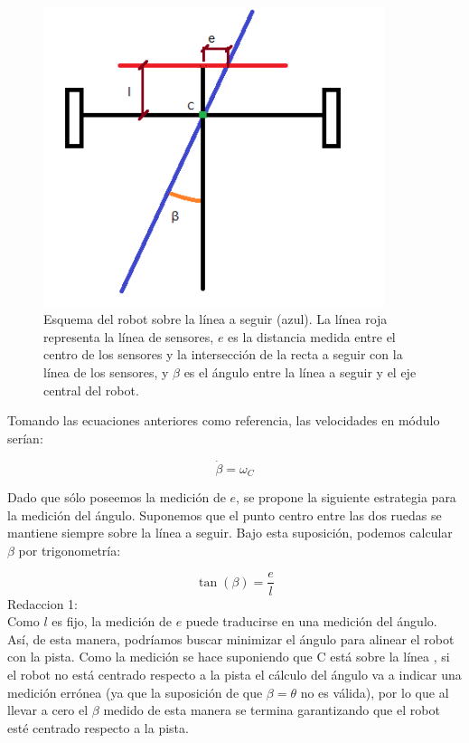 \documentclass[10pt,conference,a4paper,onecolumn]{article}%
\begin{document}
\begin{figure}[h]
\centering
\includegraphics[width=10cm]{./imagenes/carrito1.png}
\caption{Esquema del robot sobre la línea a seguir (azul). La línea roja representa la línea de sensores, $e$ es la distancia medida entre el centro de los sensores y la intersección de la recta a seguir con la línea de los sensores, y $\beta $ es el ángulo entre la línea a seguir y el eje central del robot.}
\label{fig:carrito1}
\end{figure}

Tomando las ecuaciones anteriores como referencia, las velocidades en módulo serían:

\begin{equation}
\dot{\beta}=\omega_C
\end{equation}

Dado que sólo poseemos la medición de $e$, se propone la siguiente estrategia para la medición del ángulo. Suponemos que el punto centro entre las dos ruedas se mantiene siempre sobre la línea a seguir. Bajo esta suposición, podemos calcular $\beta $ por trigonometría:

\begin{equation}
\tan(\beta)=\frac{e}{l}
\end{equation}
Redaccion 1:\\
Como $l$ es fijo, la medición de $e$ puede traducirse en una medición del ángulo. Así, de esta manera, podríamos buscar minimizar el ángulo para alinear el robot con la pista. Como la medición se hace suponiendo que C está sobre la línea , si el robot no está centrado respecto a la pista el cálculo del ángulo va a indicar una medición errónea (ya que la suposición de que $\beta=\theta$ no es válida), por lo que al llevar a cero el $ \beta $ medido de esta manera se termina garantizando que el robot esté centrado respecto a la pista.
\end{document}
